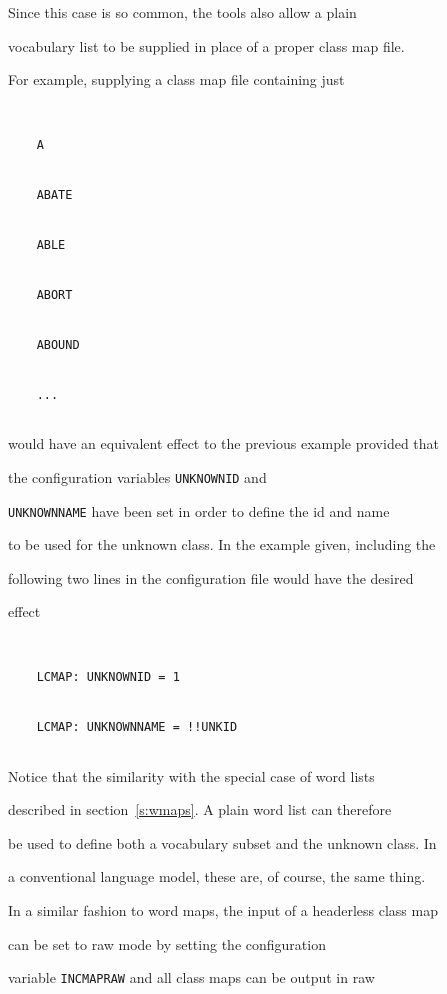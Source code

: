 Since this case is so common, the tools also allow a plain


vocabulary list to be supplied in place of a proper class map file.


For example, supplying a class map file containing just


\begin{verbatim}


    A


    ABATE


    ABLE


    ABORT


    ABOUND


    ...


\end{verbatim}


would have an equivalent effect to the previous example provided that


the  configuration variables \texttt{UNKNOWNID} and


\texttt{UNKNOWNNAME} have been set in order to define the id and name


to be used for the unknown class.  In the example given, including the


following two lines in the configuration file would have the desired


effect


\begin{verbatim}


    LCMAP: UNKNOWNID = 1


    LCMAP: UNKNOWNNAME = !!UNKID


\end{verbatim}


Notice that the similarity with the special case of word lists


described in section~\ref{s:wmaps}.  A plain word list can therefore


be used to define both a vocabulary subset and the unknown class.  In


a conventional language model, these are, of course, the same thing.





In a similar fashion to word maps, the input of a headerless class map


can be set to raw mode by setting the  configuration


variable \texttt{INCMAPRAW} and all class maps can be output in raw


